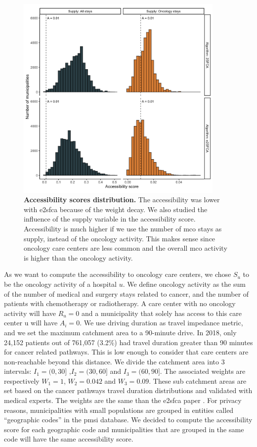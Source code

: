 \begin{figure}[H]
    \includegraphics[width=0.9\textwidth]{images/camion/sup_fig5_accessibility_distribution.png}
    \centering
    \caption{ \textbf{Accessibility scores distribution.} The accessibility was
        lower with \ac{e2sfca} because of the weight decay. We also studied the
        influence of the supply variable in the accessibility score. Accessibility is
        much higher if we use the number of \ac{mco} stays as supply, instead of the
        oncology activity. This makes sense since oncology care centers are less common
        and the overall \ac{mco} activity is higher than the oncology activity. }
    \label{fig:accessibility-distribution}
\end{figure}

As we want to compute the accessibility to oncology care centers, we chose $S_u$
to be the oncology activity of a hospital $u$. We define oncology activity as
the sum of the number of medical and surgery stays related to cancer, and the
number of patients with chemotherapy or radiotherapy. A care center with no
oncology activity will have $R_u=0$ and a municipality that solely has access to
this care center u will have $A_i=0$. We use driving duration as travel
impedance metric, and we set the maximum catchment area to a 90-minute drive. In
2018, only 24,152 patients out of 761,057 (3.2\%) had travel duration greater
than 90 minutes for cancer related pathways. This is low enough to consider that
care centers are non-reachable beyond this distance. We divide the catchment
area into 3 intervals: $I_1=(0,30]$ ,$I_2=(30,60]$ and $I_3=(60,90]$. The
associated weights are respectively $W_1=1$, $W_2=0.042$ and $W_3=0.09$. These
sub catchment areas are set based on the cancer pathways travel duration
distributions and validated with medical experts. The weights are the same than
the \ac{e2sfca} paper \cite{luo_enhanced_2009}. For privacy reasons,
municipalities with small populations are grouped in entities called
``geographic codes'' in the \ac{pmsi} database. We decided to compute the
accessibility score for each geographic code and municipalities that are grouped
in the same code will have the same accessibility score.

